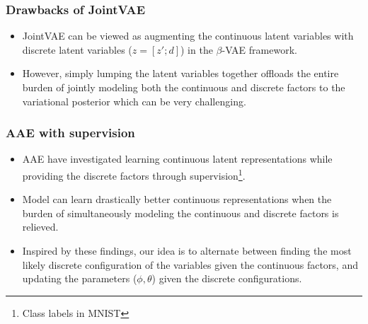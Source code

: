 \documentclass[10pt,mathserif]{beamer}
\begin{document}
\begin{frame}
\frametitle{Drawbacks of JointVAE}
\begin{itemize}\itemsep=12pt
\item JointVAE can be viewed as  augmenting the continuous latent variables with discrete latent variables ($z=[z'; d]$) in the $\beta$-VAE framework.\pause
\item However, simply lumping the latent variables together offloads the entire burden of jointly modeling both the continuous and discrete factors to the variational posterior which can be very challenging.
\end{itemize}
\end{frame} 

\begin{frame}
\frametitle{AAE with supervision}
\begin{itemize}\itemsep=12pt
\item AAE have investigated learning continuous latent representations while providing the discrete factors through supervision\footnote{Class labels in MNIST}.\pause
\item Model can learn drastically better continuous representations when the burden of simultaneously modeling the continuous and discrete factors is relieved.\pause
\item Inspired by these findings, our idea is to alternate between finding the most likely discrete configuration of the variables given the continuous factors, and updating the parameters ($\phi,\theta$) given the discrete configurations. 
\end{itemize}
\end{frame} 

\end{document}
